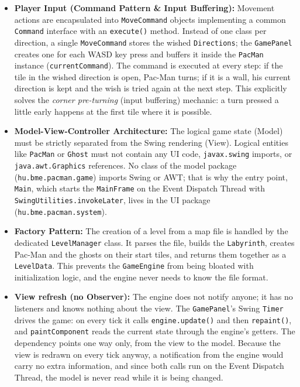 \documentclass[11pt, a4paper]{article}
\begin{document}
\begin{itemize}
    \item \textbf{Player Input (Command Pattern \& Input Buffering):} Movement actions are encapsulated into \texttt{MoveCommand} objects implementing a common \texttt{Command} interface with an \texttt{execute()} method. Instead of one class per direction, a single \texttt{MoveCommand} stores the wished \texttt{Directions}; the \texttt{GamePanel} creates one for each WASD key press and buffers it inside the \texttt{PacMan} instance (\texttt{currentCommand}). The command is executed at every step: if the tile in the wished direction is open, Pac-Man turns; if it is a wall, his current direction is kept and the wish is tried again at the next step. This explicitly solves the \textit{corner pre-turning} (input buffering) mechanic: a turn pressed a little early happens at the first tile where it is possible.
    \item \textbf{Model-View-Controller Architecture:} The logical game state (Model) must be strictly separated from the Swing rendering (View). Logical entities like \texttt{PacMan} or \texttt{Ghost} must not contain any UI code, \texttt{javax.swing} imports, or \texttt{java.awt.Graphics} references. No class of the model package (\texttt{hu.bme.pacman.game}) imports Swing or AWT; that is why the entry point, \texttt{Main}, which starts the \texttt{MainFrame} on the Event Dispatch Thread with \texttt{SwingUtilities.invokeLater}, lives in the UI package (\texttt{hu.bme.pacman.system}).
    \item \textbf{Factory Pattern:} The creation of a level from a map file is handled by the dedicated \texttt{LevelManager} class. It parses the file, builds the \texttt{Labyrinth}, creates Pac-Man and the ghosts on their start tiles, and returns them together as a \texttt{LevelData}. This prevents the \texttt{GameEngine} from being bloated with initialization logic, and the engine never needs to know the file format.
    \item \textbf{View refresh (no Observer):} The engine does not notify anyone; it has no listeners and knows nothing about the view. The \texttt{GamePanel}'s Swing \texttt{Timer} drives the game: on every tick it calls \texttt{engine.update()} and then \texttt{repaint()}, and \texttt{paintComponent} reads the current state through the engine's getters. The dependency points one way only, from the view to the model. Because the view is redrawn on every tick anyway, a notification from the engine would carry no extra information, and since both calls run on the Event Dispatch Thread, the model is never read while it is being changed.
\end{itemize}
\end{document}
